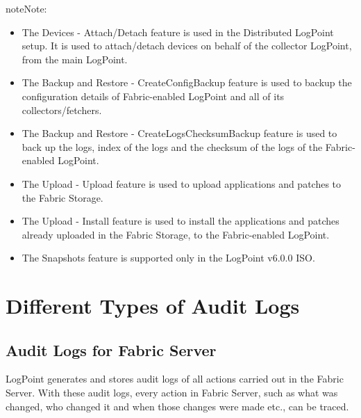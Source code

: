 \documentclass[letterpaper,10pt,oneside,english]{sphinxmanual}
\begin{document}
\begin{sphinxadmonition}{note}{Note:}\begin{itemize}
\item {} 
The Devices - Attach/Detach feature is used in the Distributed LogPoint setup. It is used to attach/detach devices on behalf of the collector LogPoint, from the main LogPoint.

\item {} 
The Backup and Restore - CreateConfigBackup feature is used to backup the configuration details of Fabric-enabled LogPoint and all of its collectors/fetchers.

\item {} 
The Backup and Restore - CreateLogsChecksumBackup feature is used to back up the logs, index of the logs and the checksum of the logs of the Fabric-enabled LogPoint.

\item {} 
The Upload - Upload feature is used to upload applications and patches to the Fabric Storage.

\item {} 
The Upload - Install feature is used to install the applications and patches already uploaded in the Fabric Storage, to the Fabric-enabled LogPoint.

\item {} 
The Snapshots feature is supported only in the LogPoint v6.0.0 ISO.

\end{itemize}
\end{sphinxadmonition}


\section{Different Types of Audit Logs}
\label{\detokenize{applicationnote:different-types-of-audit-logs}}\label{\detokenize{applicationnote:id1}}

\subsection{Audit Logs for Fabric Server}
\label{\detokenize{applicationnote:audit-logs-for-fabric-server}}
LogPoint generates and stores audit logs of all actions carried out in the Fabric Server. With these audit logs, every action in Fabric Server, such as what was changed, who changed it and when those changes were made etc., can be traced.



\renewcommand{\indexname}{Index}
\printindex
\end{document}
